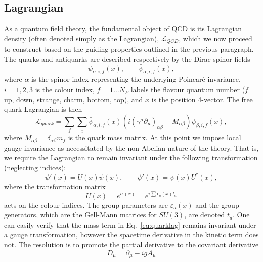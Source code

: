 \documentclass[11pt, a4paper, twoside]{book}
\newcommand{\brac}[1] {\!\left(#1\right)}
\begin{document}
\subsection{Lagrangian}
\label{sec:QCDLagr}
As a quantum field theory, the fundamental object of QCD is its Lagrangian density (often denoted simply as the Lagrangian), \(\mathcal{L}_{QCD}\), which we now proceed to construct based on the guiding properties outlined in the previous paragraph. The quarks and antiquarks are described respectively by the Dirac spinor fields 
\begin{equation}
\psi_{\alpha,i,f}\brac{x}, \quad\quad \bar{\psi}_{\alpha,i,f}\brac{x},
\end{equation} 
where \(\alpha\) is the spinor index representing the underlying Poincar\'e invariance, \(i=1,2,3\) is the colour index, \(f=1\ldots N_{F}\) labels the flavour quantum number (\(f=\) up, down, strange, charm, bottom, top), and \(x\) is the position 4-vector. The free quark Lagrangian is then
\begin{equation}
\label{eq:quarklag}
\mathcal{L}_{quark}=\sum_{f}\sum_{i}\bar{\psi}_{\alpha,i,f}\brac{x}\brac{i\brac{\gamma^{\mu}\partial_{\mu}}_{\alpha\beta}-M_{\alpha\beta}}\psi_{\beta,i,f}\brac{x},
\end{equation}
where \(M_{\alpha\beta}=\delta_{\alpha\beta}m_f\) is the quark mass matrix. At this point we impose local gauge invariance as necessitated by the non-Abelian nature of the theory. That is, we require the Lagrangian to remain invariant under the following transformation (neglecting indices):
\begin{equation}
\psi '\brac{x}=U\brac{x}\psi\brac{x},\quad\quad\bar{\psi}'\brac{x}=\bar{\psi}\brac{x}U^\dagger\brac{x},
\end{equation}
where the transformation matrix 
\begin{equation}
U\brac{x}=e^{i\epsilon\left(x\right)}=e^{i\sum\epsilon_a\brac{x} t_a}
\end{equation}
acts on the colour indices. The group parameters are \(\varepsilon_a\brac{x}\) and the group generators, which are the Gell-Mann matrices for \(SU\brac{3}\), are denoted \(t_a\). One can easily verify that the mass term in Eq.~\eqref{eq:quarklag} remains invariant under a gauge transformation, however the spacetime derivative in the kinetic term does not. The resolution is to promote the partial derivative to the covariant derivative 
\begin{equation}
D_\mu=\partial_\mu-igA_\mu
\end{equation}
\end{document}
